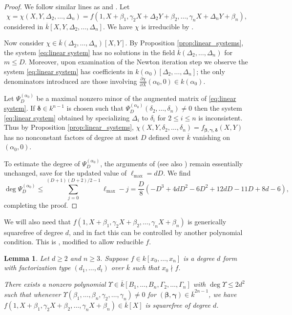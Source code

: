 \documentclass{amsart}
\renewcommand{\v}{\beta}
\newcommand{\w}{\gamma}
\newcommand{\z}{\delta}
\newcommand{\vvar}{B}
\newcommand{\wvar}{\Gamma}
\newcommand{\zvar}{\Delta}
\newcommand{\bv}{\boldsymbol{\v}}
\newcommand{\bw}{\boldsymbol{\w}}
\newcommand{\bz}{\boldsymbol{\z}}
\newcommand{\lmax}{\ell_{\max}}
\newtheorem{lemma}[theorem]{Lemma}
\theoremstyle{definition}
\numberwithin{equation}{section}
\numberwithin{table}{section}
\begin{document}
\begin{proof}
We follow similar lines as \cite[Theorem 5]{Kaltofen} and \cite[Theorem 3.3]{CafureMatera}. Let 
    \[\chi = \chi(X,Y,\zvar_2, \ldots, \zvar_n) = f(1,X +\v_1,\w_2X + \zvar_2Y +\v_2, \ldots,\w_nX + \zvar_nY +\v_n),\]
    considered in $\overline{k}[X,Y,\zvar_2,\ldots,\zvar_n]$. We have $\chi$ is irreducible by \cite[Lemma 5]{Kaltofen}.

    Now consider $\chi \in \overline{k}(\zvar_2, \ldots, \zvar_n)[X,Y]$. By Proposition \ref{prop:linear_systems}, the system \eqref{eq:linear system} has no solutions in the field $\overline{k}(\zvar_2, \ldots, \zvar_n)$ for $m\leq D$. Moreover, upon examination of the Newton iteration step \cite[Step N]{Kaltofen, CafureMatera} we observe the system \eqref{eq:linear system} has coefficients in $k(\alpha_0)[\zvar_2, \ldots, \zvar_n]$; the only denominators introduced are those involving $\frac{\partial \chi}{\partial X}(\alpha_0, 0) \in k(\alpha_0)$.

    Let $\Psi_D^{(\alpha_0)}$ be a maximal nonzero minor of the augmented matrix of \eqref{eq:linear system}. If $\bz \in k^{n-1}$ is chosen such that $\Psi_D^{(\alpha_0)}(\z_2, \ldots, \z_n) \neq 0$ then the system \eqref{eq:linear system} obtained by specializing $\zvar_i$ to $\z_i$ for $2 \leq i \leq n$ is inconsistent. Thus by Proposition \ref{prop:linear_systems}, $\chi(X,Y,\z_2,\ldots,\z_n) = f_{\bv, \bw, \bz}(X,Y)$ has no nonconstant factors of degree at most $D$ defined over $\overline{k}$ vanishing on $(\alpha_0, 0)$.

	To estimate the degree of $\Psi_{D}^{(\alpha_0)}$, the arguments of \cite[Theorem 3.3]{CafureMatera} (see also \cite[Theorem 5]{Kaltofen}) remain essentially unchanged, save for the updated value of $\lmax = dD$. We find
    \[\deg \Psi_D^{(\alpha_0)} \leq \sum_{j=0}^{(D+1)(D+2)/2-1} \lmax - j = \frac{D}{8} \left(-D^3 + 4dD^2 - 6D^2 + 12dD - 11D + 8d - 6\right),\]
    completing the proof.
\end{proof}

We will also need that $f(1,X+\v_1,\w_2X +\v_2,\ldots,\w_nX +\v_n)$ is generically squarefree of degree $d$, and in fact this can be controlled by another polynomial condition. This is \cite[Lemma 4]{Kaltofen}, modified to allow reducible $f$.

\begin{lemma}
\label{lem:upsilon}
	Let $d \geq 2$ and $n \geq 3$. Suppose $f \in k[x_0,\ldots,x_n]$ is a degree $d$ form with factorization type $(d_1,\ldots,d_t)$ over $\overline{k}$ such that $x_0 \nmid f$.
	
	There exists a nonzero polynomial $\Upsilon \in \overline{k}[\vvar_1, \ldots, \vvar_n, \wvar_2, \ldots, \wvar_n]$ with $\deg \Upsilon \leq 2d^2$ such that whenever $\Upsilon(\v_1, \ldots,\v_n,\w_2, \ldots,\w_n) \neq 0$ for $(\bv,\bw) \in \overline{k}^{2n-1}$, we have $f(1,X + \v_1, \w_2X + \v_2, \ldots, \w_nX + \v_n) \in \overline{k}[X]$ is squarefree of degree $d$.
\end{lemma}
\end{document}
